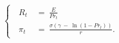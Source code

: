 \begin{equation}
    \begin{cases}
        \begin{split}
        \ R_{t} \
        & = \ \frac{E}{Pr_{t}} \\
        \ \pi_{t} \
        & = \ \frac{\sigma \left( \gamma \ - \ \ln(1 - Pr_{t}) \right)}{r}.
        \end{split}
    \end{cases}
\label{Equation:Social-Planners-Problem_System-of-Equations-for-Steady-State}
\end{equation}
